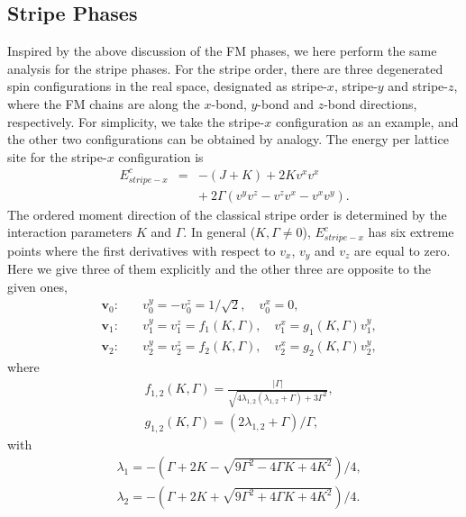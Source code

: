 \documentclass[aps,prb,reprint,amsfonts,amsmath,amssymb,showpacs,groupedaddress,superscriptaddress]{revtex4-1}
\begin{document}
\subsection{\label{subsec:StripePhases}Stripe Phases}

Inspired by the above discussion of the FM phases, we here perform the same analysis for the stripe phases. For the stripe order, there are three degenerated spin configurations in the real space, designated as stripe-$x$, stripe-$y$ and stripe-$z$, where the FM chains are along the $x$-bond, $y$-bond and $z$-bond directions, respectively. For simplicity, we take the stripe-$x$ configuration as an example, and the other two configurations can be obtained by analogy. The energy per lattice site for the stripe-$x$ configuration is
\begin{eqnarray}
    E_{stripe-x}^{c} & = & -(J + K) + 2 K v^x v^x \nonumber \\
        & & +\: 2 \Gamma (v^y v^z - v^z v^x - v^x v^y).
        \label{eq:EcStripeX}
\end{eqnarray}
The ordered moment direction of the classical stripe order is determined by the interaction parameters $K$ and $\Gamma$. In general ($K,\Gamma \neq 0$), $E_{stripe-x}^{c}$ has six extreme points where the first derivatives with respect to $v_x$, $v_y$ and $v_z$ are equal to zero. Here we give three of them explicitly and the other three are opposite to the given ones,
\begin{subequations}
    \label{eq:whole}
    \begin{eqnarray}
        & \bm{v}_0:& \quad v_{0}^{y}=-v_{0}^{z} = 1/\sqrt{2}, \quad v_{0}^{x} = 0, \label{eq:v0} \\
        & \bm{v}_1:& \quad v_{1}^{y}=v_{1}^{z} = f_{1}(K, \Gamma), \quad v_{1}^{x} = g_{1}(K, \Gamma) v_{1}^{y}, \label{eq:v1} \\
        & \bm{v}_2:& \quad v_{2}^{y}=v_{2}^{z} = f_{2}(K, \Gamma), \quad v_{2}^{x} = g_{2}(K, \Gamma) v_{2}^{y}, \label{eq:v2}
    \end{eqnarray}
\end{subequations}
where
\begin{align}
& f_{1,2}(K, \Gamma)= \frac{|\Gamma|}{\sqrt{4 \lambda_{1,2} (\lambda_{1,2} + \Gamma) + 3 \Gamma^{2}}}, \nonumber \\
& g_{1,2}(K, \Gamma)= (2 \lambda_{1,2} + \Gamma) / \Gamma, \nonumber
\end{align}
with
\begin{align}
& \lambda_{1}=- (\Gamma +2 K - \sqrt{9\Gamma^2 - 4 \Gamma K + 4 K^2}) / 4, \nonumber \\
& \lambda_{2}=-(\Gamma +2 K + \sqrt{9\Gamma^2 + 4 \Gamma K + 4 K^2}) / 4. \nonumber
\end{align}
\end{document}
